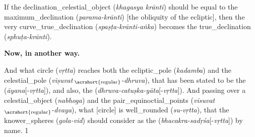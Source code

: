 \noindent\reversemarginpar{}%
If the \gls{declination_celestial_object} (\textit{khagasya krānti}) should be equal to the \gls{maximum_declination} (\textit{parama-krānti}) [\ie the obliquity of the ecliptic], then the very \gls{curve_true_declination} (\textit{spa\-ṣṭa-krānti-aṅka}) becomes the \gls{true_declination} (\textit{sphuṭa-krānti}).
\bigskip

\textbf{Now, in another way.}
\bigskip

\noindent\reversemarginpar{}%
And what \gls{circle} (\textit{vṛtta}) reaches both the \gls{ecliptic_pole} (\textit{kadamba}) and the \gls{celestial_pole} (\textit{viṣuvat}\,$_\text{\acrshort{regular}}$-\textit{dhruva}), that has been stated to be the  (\textit{āyana}[-\textit{vṛtta}]), and also, the  (\textit{dhruva-catuṣka-yāta}[-\textit{vṛtta}]). And passing over a \gls{celestial_object} (\textit{nabhoga}) and the \gls{pair_equinoctial_points} (\textit{visuvat}\,$_\text{\acrshort{regular}}$-\textit{dvaya}), what [circle] is \gls{well_rounded} (\textit{su-vṛtta}), that the \gls{knower_spheres} (\textit{gola-vid}) should consider as
the  (\textit{bhacakra-sadṛśa}[-\textit{vṛtta}]) by name. 1 
\label{verse_1_label_eng_example}


\clearpage{}

